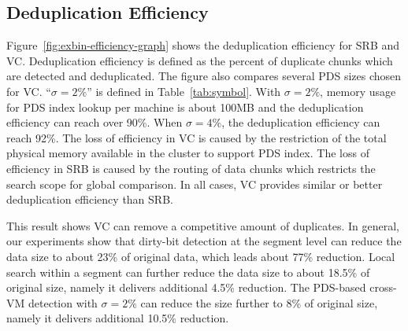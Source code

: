 \subsection{Deduplication Efficiency}



Figure~\ref{fig:exbin-efficiency-graph} shows the deduplication efficiency for SRB and VC.
Deduplication efficiency is defined as the percent of duplicate chunks
which are detected and deduplicated.
The figure also compares several PDS sizes chosen for VC. ``$\sigma=2\%$'' 
is defined in Table~\ref{tab:symbol}. 
With $\sigma=2\%$, memory usage for PDS index lookup per machine is about 100MB
and  the deduplication efficiency can reach over 90\%.
When $\sigma=4\%$, the deduplication efficiency can reach 92\%. 
The loss of efficiency in VC is caused by the restriction of the total physical memory available
in the cluster to support PDS index.  
The loss of efficiency in SRB is caused by the routing of data chunks which restricts the search scope
for global comparison.
In all cases, VC provides similar or better deduplication efficiency than SRB.

This result shows VC can remove  a competitive amount of duplicates.
In general, our experiments show that
dirty-bit detection at the segment level  can reduce the data size to about 23\% of original data, 
which leads  about 77\% reduction.
Local search within a segment can   further reduce the data size
to about 18.5\% of original size, namely it delivers additional 4.5\% reduction.
The PDS-based cross-VM detection with $\sigma=2\% $
can reduce the  size further to 8\% of original size, namely it 
delivers additional 10.5\% reduction.


